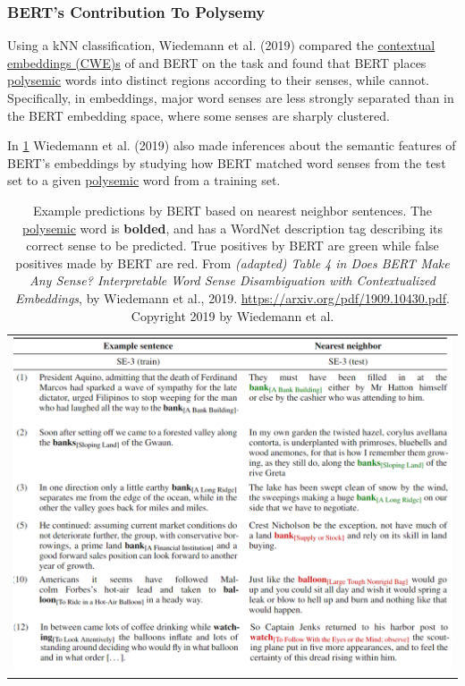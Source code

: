 \subsubsection{BERT's Contribution To Polysemy} %

Using a kNN classification, Wiedemann et al. (2019) compared the \hyperref[sec:SolutionWithContextEmbs]{contextual embeddings (CWE)s} of  and BERT on the  task and found that BERT places \hyperref[sec:Polysemy]{polysemic} words into distinct regions according to their senses, while  cannot. Specifically, in  embeddings, major word senses are less strongly separated than in the BERT embedding space, where some senses are sharply clustered. 

In \cref{tbl:bertPolysemy} Wiedemann et al. (2019) also made inferences about the semantic features of BERT's embeddings by studying how BERT matched word senses from the test set to a given \hyperref[sec:Polysemy]{polysemic} word from a training set.



\begin{table}[ht!]
  \centering
  \caption{\footnotesize Example predictions by BERT based on nearest neighbor sentences. The \hyperref[sec:Polysemy]{polysemic} word is \textbf{bolded}, and has a WordNet description tag describing its correct sense to be predicted. {\color{ForestGreen} True positives by BERT are green} while {\color{Red} false positives made by BERT are red}. From \emph{(adapted) Table 4 in Does BERT Make Any Sense? Interpretable Word Sense Disambiguation with Contextualized Embeddings}, by Wiedemann et al., 2019. \url{https://arxiv.org/pdf/1909.10430.pdf}. Copyright 2019 by Wiedemann et al.}
  \begin{tabular}{ c }
    
    \begin{minipage}{.9\textwidth}
      \includegraphics[width=\linewidth]{imgs/table_bertPolysemyTests.png}
    \end{minipage}
    
  \end{tabular}
  \label{tbl:bertPolysemy}
\end{table}



